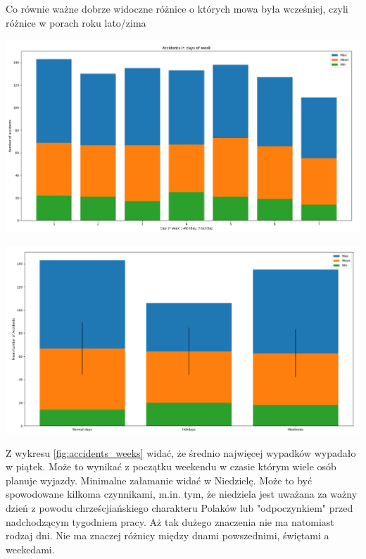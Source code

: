 \documentclass{article}
\begin{document}
Co równie ważne dobrze widoczne różnice o których mowa była wcześniej, czyli różnice w porach roku lato/zima

\begin{center}
    \includegraphics[scale=0.3]{visualization/accidents_days_of_week.png}
    \captionsetup{hypcap=false}
    \label{fig:accidents_weeks}
\end{center}

\begin{center}
    \includegraphics[scale=0.3]{visualization/normal_vs_holidays_vs_weekends.png}
    \captionsetup{hypcap=false}
    \label{fig:accidents_types}
\end{center}

Z wykresu \ref{fig:accidents_weeks} widać, że średnio najwięcej wypadków wypadało w piątek. Może to wynikać z początku weekendu w czasie którym wiele osób planuje wyjazdy. Minimalne załamanie widać w Niedzielę. Może to być spowodowane kilkoma czynnikami, m.in. tym, że niedziela jest uważana za ważny dzień z powodu chrześcjiańskiego charakteru Polaków lub "odpoczynkiem" przed nadchodzącym tygodniem pracy.
Aż tak dużego znaczenia nie ma natomiast rodzaj dni. Nie ma znaczej różnicy między dnami powszednimi, świętami a weekedami. 
\end{document}
